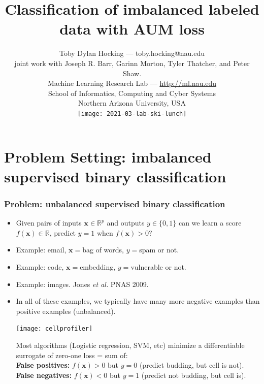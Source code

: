 \documentclass[t]{beamer}
\begin{document}
\title{Classification of imbalanced labeled data with AUM loss}

\author{
  Toby Dylan Hocking --- toby.hocking@nau.edu\\
  joint work with Joseph R. Barr, Garinn Morton, Tyler Thatcher, and Peter Shaw.\\
  Machine Learning Research Lab --- \url{http://ml.nau.edu}\\
  School of Informatics, Computing and Cyber Systems\\
  Northern Arizona University, USA\\
  \texttt{[image: 2021-03-lab-ski-lunch]} \\
}

\date{}

\maketitle

\section{Problem Setting: imbalanced supervised  binary classification}

\begin{frame}
  \frametitle{Problem: unbalanced supervised binary classification}
  
  \begin{itemize}
  \item Given pairs of inputs $\mathbf x\in\mathbb R^p$ and outputs
    $y\in\{0,1\}$ can we learn a score 
    $f(\mathbf x)\in\mathbb R$, predict $y=1$ when $f(\mathbf x)>0$?
  \item Example: email, $\mathbf x =$bag of words, $y=$spam or not.
  \item Example: code, $\mathbf x =$embedding, $y=$vulnerable or not.
  \item Example: images. Jones {\it et al.} PNAS 2009.
  \item In all of these examples, we typically have many more negative
    examples than positive examples (unbalanced).
    \parbox{1.5in}{\texttt{[image: cellprofiler]}}
    \parbox{2.4in}{Most algorithms (Logistic regression, SVM, etc) minimize a differentiable surrogate of zero-one loss = sum of:\\
      \textbf{False positives:} $f(\mathbf x)>0$ but $y=0$ (predict
      budding, but cell is not).\\
      \textbf{False negatives:} $f(\mathbf x)<0$ but $y=1$ (predict
      not budding, but cell is).
  }
  \end{itemize} 
\end{frame}
\end{document}
